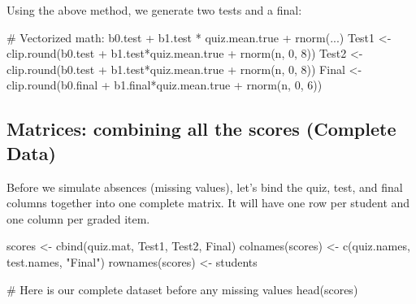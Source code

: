 \documentclass[
  letterpaper,
  DIV=11,
  numbers=noendperiod]{scrreprt}
\newenvironment{Shaded}{\begin{snugshade}}{\end{snugshade}}
\newcommand{\CommentTok}[1]{\textcolor[rgb]{0.37,0.37,0.37}{#1}}
\newcommand{\DecValTok}[1]{\textcolor[rgb]{0.68,0.00,0.00}{#1}}
\newcommand{\FunctionTok}[1]{\textcolor[rgb]{0.28,0.35,0.67}{#1}}
\newcommand{\NormalTok}[1]{\textcolor[rgb]{0.00,0.23,0.31}{#1}}
\newcommand{\OtherTok}[1]{\textcolor[rgb]{0.00,0.23,0.31}{#1}}
\newcommand{\SpecialCharTok}[1]{\textcolor[rgb]{0.37,0.37,0.37}{#1}}
\newcommand{\StringTok}[1]{\textcolor[rgb]{0.13,0.47,0.30}{#1}}
\begin{document}
Using the above method, we generate two tests and a final:

\begin{Shaded}
\begin{Highlighting}[]
\CommentTok{\# Vectorized math: b0.test + b1.test * quiz.mean.true + rnorm(...)}
\NormalTok{Test1 }\OtherTok{\textless{}{-}} \FunctionTok{clip.round}\NormalTok{(b0.test  }\SpecialCharTok{+}\NormalTok{ b1.test}\SpecialCharTok{*}\NormalTok{quiz.mean.true  }\SpecialCharTok{+} \FunctionTok{rnorm}\NormalTok{(n, }\DecValTok{0}\NormalTok{, }\DecValTok{8}\NormalTok{))}
\NormalTok{Test2 }\OtherTok{\textless{}{-}} \FunctionTok{clip.round}\NormalTok{(b0.test  }\SpecialCharTok{+}\NormalTok{ b1.test}\SpecialCharTok{*}\NormalTok{quiz.mean.true  }\SpecialCharTok{+} \FunctionTok{rnorm}\NormalTok{(n, }\DecValTok{0}\NormalTok{, }\DecValTok{8}\NormalTok{))}
\NormalTok{Final }\OtherTok{\textless{}{-}} \FunctionTok{clip.round}\NormalTok{(b0.final }\SpecialCharTok{+}\NormalTok{ b1.final}\SpecialCharTok{*}\NormalTok{quiz.mean.true }\SpecialCharTok{+} \FunctionTok{rnorm}\NormalTok{(n, }\DecValTok{0}\NormalTok{, }\DecValTok{6}\NormalTok{))}
\end{Highlighting}
\end{Shaded}

\subsection{Matrices: combining all the scores (Complete
Data)}\label{matrices-combining-all-the-scores-complete-data}

Before we simulate absences (missing values), let's bind the quiz, test,
and final columns together into one complete matrix. It will have one
row per student and one column per graded item.

\begin{Shaded}
\begin{Highlighting}[]
\NormalTok{scores }\OtherTok{\textless{}{-}} \FunctionTok{cbind}\NormalTok{(quiz.mat, Test1, Test2, Final)}
\FunctionTok{colnames}\NormalTok{(scores) }\OtherTok{\textless{}{-}} \FunctionTok{c}\NormalTok{(quiz.names, test.names, }\StringTok{"Final"}\NormalTok{)}
\FunctionTok{rownames}\NormalTok{(scores) }\OtherTok{\textless{}{-}}\NormalTok{ students}

\CommentTok{\# Here is our complete dataset before any missing values}
\FunctionTok{head}\NormalTok{(scores)}
\end{Highlighting}
\end{Shaded}
\end{document}
